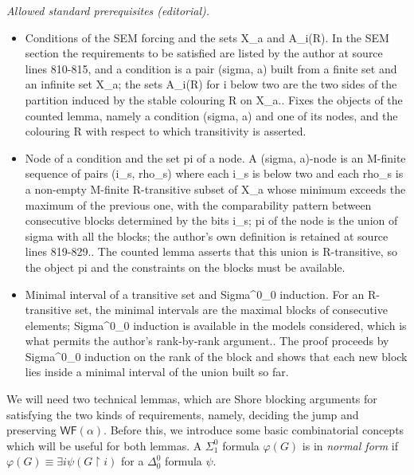 \documentclass{article}
\numberwithin{theorem}{section}
\newcommand{\WF}{\mathsf{WF}}
\newcommand{\uh}[0]{{\upharpoonright}}
\begin{document}
\noindent\textit{Allowed standard prerequisites (editorial).}\begin{itemize}
\item Conditions of the SEM forcing and the sets X\_a and A\_i(R). In the SEM section the requirements to be satisfied are listed by the author at source lines 810-815, and a condition is a pair (sigma, a) built from a finite set and an infinite set X\_a; the sets A\_i(R) for i below two are the two sides of the partition induced by the stable colouring R on X\_a.. Fixes the objects of the counted lemma, namely a condition (sigma, a) and one of its nodes, and the colouring R with respect to which transitivity is asserted.
\item Node of a condition and the set pi of a node. A (sigma, a)-node is an M-finite sequence of pairs (i\_s, rho\_s) where each i\_s is below two and each rho\_s is a non-empty M-finite R-transitive subset of X\_a whose minimum exceeds the maximum of the previous one, with the comparability pattern between consecutive blocks determined by the bits i\_s; pi of the node is the union of sigma with all the blocks; the author's own definition is retained at source lines 819-829.. The counted lemma asserts that this union is R-transitive, so the object pi and the constraints on the blocks must be available.
\item Minimal interval of a transitive set and Sigma\textasciicircum{}0\_0 induction. For an R-transitive set, the minimal intervals are the maximal blocks of consecutive elements; Sigma\textasciicircum{}0\_0 induction is available in the models considered, which is what permits the author's rank-by-rank argument.. The proof proceeds by Sigma\textasciicircum{}0\_0 induction on the rank of the block and shows that each new block lies inside a minimal interval of the union built so far.
\end{itemize}\medskip
We will need two technical lemmas, which are Shore blocking arguments for satisfying the two kinds of requirements, namely, deciding the jump and preserving $\WF(\alpha)$. Before this, we introduce some basic combinatorial concepts which will be useful for both lemmas. A $\Sigma^0_1$ formula $\varphi(G)$ is in \emph{normal form} if $\varphi(G) \equiv \exists i \psi(G \uh i)$ for a $\Delta^0_0$ formula $\psi$.
\end{document}
